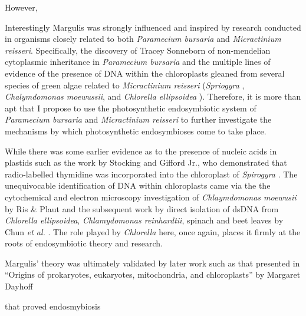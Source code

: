 However,  









Interestingly Margulis was strongly influenced and inspired by research conducted
in organisms closely related to both \textit{Paramecium bursaria} and 
\textit{Micractinium reisseri}. Specifically, the discovery of Tracey Sonneborn
of non-mendelian cytoplasmic inheritance in \textit{Paramecium bursaria} \citep{Sonneborn1950}
and the multiple lines of evidence of the presence of DNA within the chloroplasts
gleaned from several species of green algae related to \textit{Micractinium reisseri}
(\textit{Spriogyra} \citep{Stocking1959}, \textit{Chalymdomonas moewussii}, and 
\textit{Chlorella ellipsoidea} \cite{Ris1962}).  Therefore, it is more than apt
that I propose to use the photosynthetic endosymbiotic system of \textit{Paramecium bursaria}
and \textit{Micractinium reisseri} to further investigate the mechanisms by which
photosynthetic endosymbioses come to take place.











While there was some earlier evidence as to the presence of nucleic acids in 
plastids such as the work by Stocking and Gifford Jr., who demonstrated that
radio-labelled thymidine was incorporated into the chloroplast of \textit{Spirogyra}
\citep{Stocking1959}.
The unequivocable identification of DNA within chloroplasts came via the 
the cytochemical and electron microscopy investigation of \textit{Chlaymdomonas moewusii} 
by Ris \& Plaut \citep{Ris1962} and the subsequent work by direct isolation of
dsDNA from \textit{Chlorella ellipsoidea}, \textit{Chlamydomonas reinhardtii}, spinach
and beet leaves by Chun \textit{et al.} \citep{Chun1963}. The role played by
\textit{Chlorella} here, once again, places it firmly at the roots of endosymbiotic
theory and research.






Margulis' theory was ultimately validated by later work such as that presented in 
``Origins of prokaryotes, eukaryotes, mitochondria, and chloroplasts'' by Margaret Dayhoff 

that proved endosmybiosis \citep{Schwartz1976}



